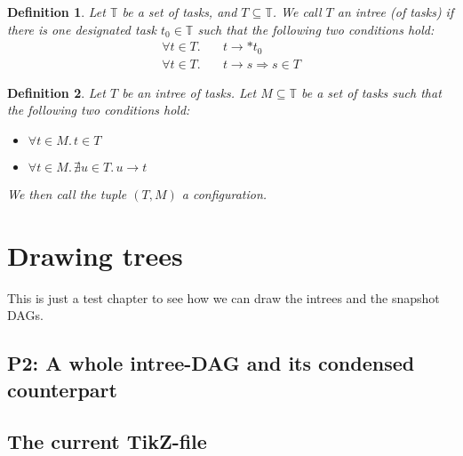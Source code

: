 \documentclass[letter]{report}
\newtheorem{definition}{Definition}[chapter]
\newcommand{\alltasks}{{\mathbb T}}
\newcommand{\neededfor}{\rightarrow}
\begin{document}
\begin{definition}
  Let $\alltasks$ be a set of tasks, and $T \subseteq \alltasks$. We call $T$ an intree (of tasks) if there is one designated task $t_0\in\alltasks$ such that the following two conditions hold:
  \begin{eqnarray*}
    \forall  t \in T. & \quad t \neededfor* t_0 \\
    \forall  t \in T. & \quad t\neededfor s \Rightarrow s\in T
  \end{eqnarray*}
\end{definition}

\begin{definition}
  Let $T$ be an intree of tasks. Let $M\subseteq\alltasks$ be a set of tasks such that the following two conditions hold:
  \begin{itemize}
  \item $\forall t\in M.\, t \in T$
  \item $\forall t\in M.\, \nexists u \in T.\, u\neededfor t $
  \end{itemize}
  We then call the tuple $\left( T, M \right)$ a \emph{configuration}.
\end{definition}

\chapter{Drawing trees}
\label{chap:drawing-trees}

This is just a test chapter to see how we can draw the intrees and the snapshot DAGs.
\newsavebox{\nodebox}

\section{P2: A whole intree-DAG and its condensed counterpart}



%

\section{The current TikZ-file}








\end{document}
